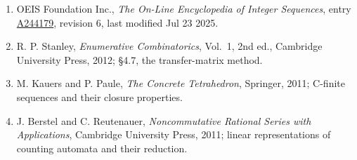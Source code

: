 \documentclass[11pt]{article}
\theoremstyle{definition}
\begin{document}
\begin{enumerate}

\item OEIS Foundation Inc., \emph{The On-Line Encyclopedia of Integer Sequences}, entry \href{https://oeis.org/A244179}{A244179}, revision 6, last modified Jul 23 2025.

\item R. P. Stanley, \emph{Enumerative Combinatorics}, Vol.~1, 2nd ed., Cambridge University Press, 2012; \S4.7, the transfer-matrix method.

\item M. Kauers and P. Paule, \emph{The Concrete Tetrahedron}, Springer, 2011; C-finite sequences and their closure properties.

\item J. Berstel and C. Reutenauer, \emph{Noncommutative Rational Series with Applications}, Cambridge University Press, 2011; linear representations of counting automata and their reduction.

\end{enumerate}
\end{document}
